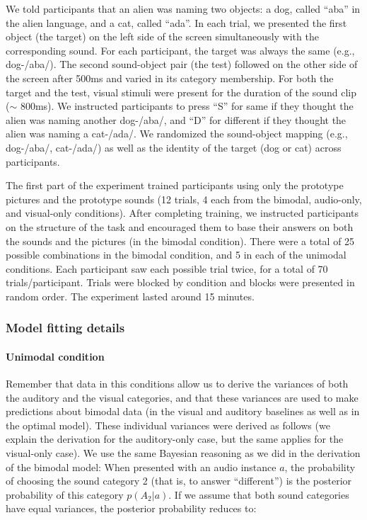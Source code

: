 \documentclass[english,floatsintext,man]{apa6}
\theoremstyle{definition}
\theoremstyle{definition}
\theoremstyle{definition}
\theoremstyle{remark}
\begin{document}
We told participants that an alien was naming two objects: a dog, called
\enquote{aba} in the alien language, and a cat, called \enquote{ada}. In
each trial, we presented the first object (the target) on the left side
of the screen simultaneously with the corresponding sound. For each
participant, the target was always the same (e.g., dog-/aba/). The
second sound-object pair (the test) followed on the other side of the
screen after 500ms and varied in its category membership. For both the
target and the test, visual stimuli were present for the duration of the
sound clip (\(\sim\) 800ms). We instructed participants to press
\enquote{S} for same if they thought the alien was naming another
dog-/aba/, and \enquote{D} for different if they thought the alien was
naming a cat-/ada/. We randomized the sound-object mapping (e.g.,
dog-/aba/, cat-/ada/) as well as the identity of the target (dog or cat)
across participants.

The first part of the experiment trained participants using only the
prototype pictures and the prototype sounds (12 trials, 4 each from the
bimodal, audio-only, and visual-only conditions). After completing
training, we instructed participants on the structure of the task and
encouraged them to base their answers on both the sounds and the
pictures (in the bimodal condition). There were a total of 25 possible
combinations in the bimodal condition, and 5 in each of the unimodal
conditions. Each participant saw each possible trial twice, for a total
of 70 trials/participant. Trials were blocked by condition and blocks
were presented in random order. The experiment lasted around 15 minutes.

\subsubsection{Model fitting details}\label{model-fitting-details}

\paragraph{Unimodal condition}\label{unimodal-condition}

Remember that data in this conditions allow us to derive the variances
of both the auditory and the visual categories, and that these variances
are used to make predictions about bimodal data (in the visual and
auditory baselines as well as in the optimal model). These individual
variances were derived as follows (we explain the derivation for the
auditory-only case, but the same applies for the visual-only case). We
use the same Bayesian reasoning as we did in the derivation of the
bimodal model: When presented with an audio instance \(a\), the
probability of choosing the sound category 2 (that is, to answer
\enquote{different}) is the posterior probability of this category
\(p(A_2|a)\). If we assume that both sound categories have equal
variances, the posterior probability reduces to:
\end{document}
